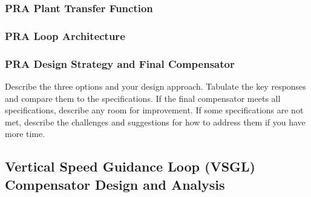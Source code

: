 \subsubsection{PRA Plant Transfer Function}

\subsubsection{PRA Loop Architecture}

\subsubsection{PRA Design Strategy and Final Compensator}

Describe the three options and your design approach. Tabulate the key responses and compare them to the specifications. If the final compensator meets all specifications, describe any room for improvement. If some specifications are not met, describe the challenges and suggestions for how to address them if you have more time.

\subsection{Vertical Speed Guidance Loop (VSGL) Compensator Design and Analysis}

